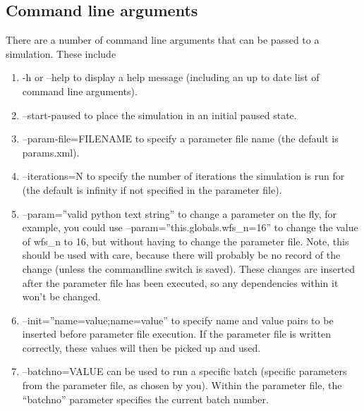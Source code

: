 \documentclass{article}
\begin{document}
\subsection{Command line arguments}
There are a number of command line arguments that can be passed to a
simulation.  These include
\begin{enumerate}
\item -h or --help to display a help message (including an up to date
  list of command line arguments).
\item --start-paused to place the simulation in an initial paused
  state.
\item --param-file=FILENAME to specify a parameter file name (the
  default is params.xml).
\item --iterations=N to specify the number of iterations the simulation
  is run for (the default is infinity if not specified in the
  parameter file).
\item --param=''valid python text string'' to change a parameter on the fly,
  for example, you could use --param=''this.globals.wfs\_n=16'' to
  change the value of wfs\_n to 16, but without having to change the
  parameter file.  Note, this should be used with care, because there
  will probably be no record of the change (unless the commandline
  switch is saved).  These changes are inserted after the parameter
  file has been executed, so any dependencies within it won't be
  changed.
\item --init=''name=value;name=value'' to specify name and value pairs
  to be inserted before parameter file execution.  If the parameter
  file is written correctly, these values will then be picked up and used.
\item --batchno=VALUE can be used to run a specific batch (specific
  parameters from the parameter file, as chosen by you).  Within the
  parameter file, the ``batchno'' parameter specifies the current
  batch number. 
\end{enumerate}
\end{document}
